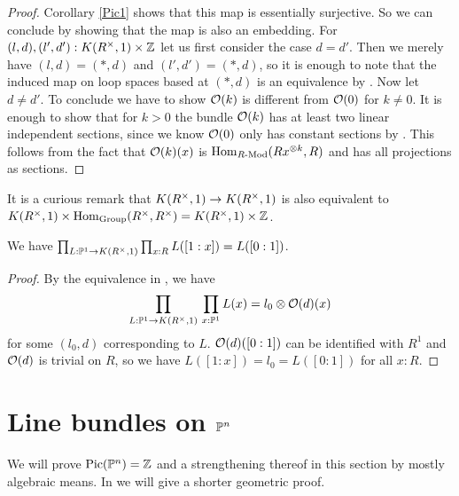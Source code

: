 \begin{proof}
  Corollary \ref{Pic1} shows that this map is essentially surjective.
  So we can conclude by showing that the map is also an embedding.
  For $(l,d),(l',d'):K(R^{\times},1)\times\mathbb{Z}$ let us first consider the case $d=d'$. 
  Then we merely have $(l,d)=(\ast,d)$ and $(l',d')=(\ast,d)$,
  so it is enough to note that the induced map on loop spaces based at $(\ast,d)$ is an equivalence by .
  Now let $d\neq d'$. To conclude we have to show $\mathcal{O}(k)$ is different from $\mathcal{O}(0)$ for $k\neq 0$.
  It is enough to show that for $k>0$ the bundle $\mathcal{O}(k)$ has at least two linear independent sections,
  since we know $\mathcal{O}(0)$ only has constant sections by .
  This follows from the fact that $\mathcal{O}(k)(x)$ is $\mathrm{Hom}_{R\text{-}\mathrm{Mod}}(Rx^{\otimes k},R)$ and has all projections as sections.
\end{proof}

 It is a curious remark that $K(R^{\times},1)\rightarrow K(R^{\times},1)$ is also equivalent
 to $K(R^{\times},1)\times \mathrm{Hom}_{\mathrm{Group}}(R^\times,R^\times) = K(R^{\times},1)\times\mathbb{Z}$.

\begin{corollary}\label{Matthias1}
  We have $\prod_{L:\mathbb{P}^1\rightarrow K(R^{\times},1)}\prod_{x:R}L([1:x]) = L([0:1])$.
\end{corollary}

\begin{proof}
  By the equivalence in , we have
  \[ \prod_{L:\mathbb{P}^1\to K(R^{\times},1)} \,\prod_{x : \mathbb{P}^1}  L(x)=l_0\otimes \mathcal{O}(d)(x) \]
  for some $(l_0,d)$ corresponding to $L$.
  $\mathcal{O}(d)([0:1])$ can be identified with $R^1$ and $\mathcal{O}(d)$ is trivial on $R$,
  so we have $L([1:x])=l_0=L([0:1])$ for all $x:R$.
\end{proof}

\section{Line bundles on $\mathbb{P}^n$}
We will prove $\mathrm{Pic}(\mathbb{P}^n)=\mathbb{Z}$ and a strengthening thereof in this section by mostly algebraic means.
In  we will give a shorter geometric proof.

